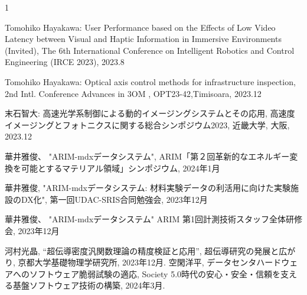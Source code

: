 \begin{招待講演}{1}

Tomohiko Hayakawa:  User Performance based on the Effects of Low Video Latency between Visual and Haptic Information in Immersive Environments (Invited), The 6th International Conference on Intelligent Robotics and Control Engineering (IRCE 2023), 2023.8

Tomohiko Hayakawa:  Optical axis control methods for infrastructure inspection, 2nd Intl. Conference Advances in 3OM , OPT23-42,Timisoara, 2023.12


末石智大: 高速光学系制御による動的イメージングシステムとその応用, 高速度イメージングとフォトニクスに関する総合シンポジウム2023, 近畿大学, 大阪, 2023.12


華井雅俊、
"ARIM-mdxデータシステム",
ARIM「第２回革新的なエネルギー変換を可能とするマテリアル領域」シンポジウム,
2024年1月

華井雅俊,
"ARIM-mdxデータシステム: 材料実験データの利活用に向けた実験施設のDX化", 
第一回UDAC-SRIS合同勉強会,
2023年12月

華井雅俊、
"ARIM-mdxデータシステム"
ARIM 第1回計測技術スタッフ全体研修会,
2023年12月

河村光晶,
``超伝導密度汎関数理論の精度検証と応用'',
超伝導研究の発展と広がり,
京都大学基礎物理学研究所,
2023年12月.
空閑洋平, データセンタハードウェアへのソフトウェア脆弱試験の適応, Society 5.0時代の安心・安全・信頼を支える基盤ソフトウェア技術の構築, 2024年3月.




\end{招待講演}
